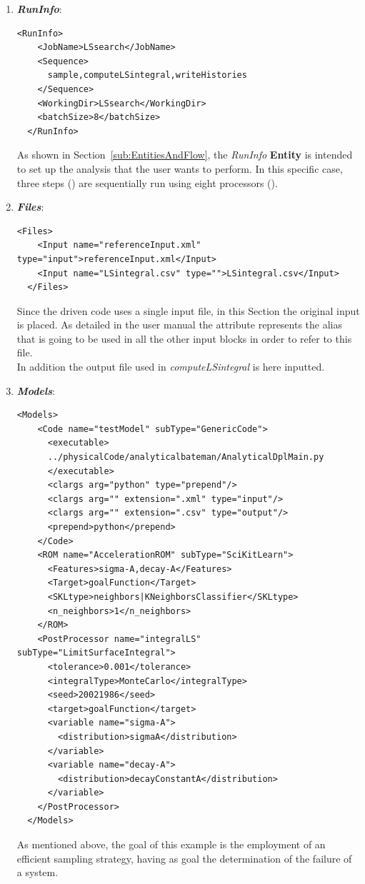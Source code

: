 \begin{enumerate}
   \item \textbf{\textit{RunInfo}}:
\begin{lstlisting}[style=XML,morekeywords={arg,extension,pauseAtEnd,overwrite}]
  <RunInfo>
    <JobName>LSsearch</JobName>
    <Sequence>
      sample,computeLSintegral,writeHistories
    </Sequence>
    <WorkingDir>LSsearch</WorkingDir>
    <batchSize>8</batchSize>
  </RunInfo>
\end{lstlisting}
   As shown in Section~\ref{sub:EntitiesAndFlow}, the \textit{RunInfo} \textbf{Entity} is intended to set up the analysis
   that the user wants to perform. In this specific case, three steps () are  sequentially run
   using eight processors ().
   \item \textbf{\textit{Files}}:
\begin{lstlisting}[style=XML,morekeywords={arg,extension,pauseAtEnd,overwrite}]
  <Files>
    <Input name="referenceInput.xml" type="input">referenceInput.xml</Input>
    <Input name="LSintegral.csv" type="">LSintegral.csv</Input>
  </Files>
\end{lstlisting}
   Since the driven code uses a single input file, in this Section the original input is placed. As detailed in the user manual
   the attribute   represents the alias that is going to be
   used in all the other input blocks in order to refer to this file.
   \\In addition the output file used in 
   \textit{computeLSintegral} is here inputted.
   \item \textbf{\textit{Models}}:
\begin{lstlisting}[style=XML,morekeywords={arg,extension,pauseAtEnd,overwrite}]
  <Models>
    <Code name="testModel" subType="GenericCode">
      <executable>
      ../physicalCode/analyticalbateman/AnalyticalDplMain.py
      </executable>
      <clargs arg="python" type="prepend"/>
      <clargs arg="" extension=".xml" type="input"/>
      <clargs arg="" extension=".csv" type="output"/>
      <prepend>python</prepend>
    </Code>
    <ROM name="AccelerationROM" subType="SciKitLearn">
      <Features>sigma-A,decay-A</Features>
      <Target>goalFunction</Target>
      <SKLtype>neighbors|KNeighborsClassifier</SKLtype>
      <n_neighbors>1</n_neighbors>
    </ROM>
    <PostProcessor name="integralLS" subType="LimitSurfaceIntegral">
      <tolerance>0.001</tolerance>
      <integralType>MonteCarlo</integralType>
      <seed>20021986</seed>
      <target>goalFunction</target>
      <variable name="sigma-A">
        <distribution>sigmaA</distribution>
      </variable>
      <variable name="decay-A">
        <distribution>decayConstantA</distribution>
      </variable>
    </PostProcessor>
  </Models>
\end{lstlisting}
 As mentioned above, the goal of this example is the employment of
 an efficient sampling strategy, having as goal the determination of the
 failure of a system.


\end{enumerate}
